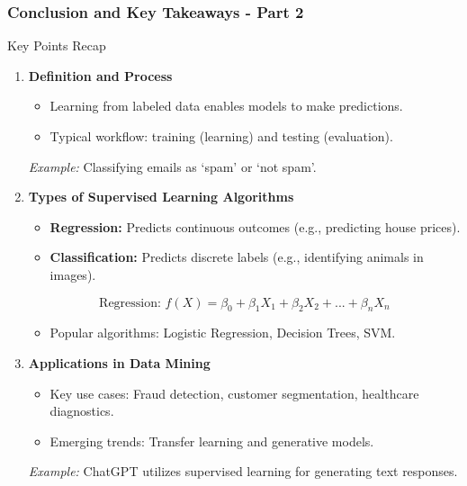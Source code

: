 \documentclass[aspectratio=169]{beamer}
\begin{document}
\begin{frame}[fragile]
    \frametitle{Conclusion and Key Takeaways - Part 2}

    \begin{block}{Key Points Recap}
        \begin{enumerate}
            \item \textbf{Definition and Process}
                \begin{itemize}
                    \item Learning from labeled data enables models to make predictions.
                    \item Typical workflow: training (learning) and testing (evaluation).
                \end{itemize}
                \textit{Example:} Classifying emails as ‘spam’ or ‘not spam’.

            \item \textbf{Types of Supervised Learning Algorithms}
                \begin{itemize}
                    \item \textbf{Regression:} Predicts continuous outcomes (e.g., predicting house prices).
                    \item \textbf{Classification:} Predicts discrete labels (e.g., identifying animals in images).
                \end{itemize}
                \begin{equation}
                    \text{Regression: } f(X) = \beta_0 + \beta_1 X_1 + \beta_2 X_2 + ... + \beta_n X_n
                \end{equation}
                \begin{itemize}
                    \item Popular algorithms: Logistic Regression, Decision Trees, SVM.
                \end{itemize}

            \item \textbf{Applications in Data Mining}
                \begin{itemize}
                    \item Key use cases: Fraud detection, customer segmentation, healthcare diagnostics.
                    \item Emerging trends: Transfer learning and generative models.
                \end{itemize}
                \textit{Example:} ChatGPT utilizes supervised learning for generating text responses.
        \end{enumerate}
    \end{block}
\end{frame}
\end{document}
